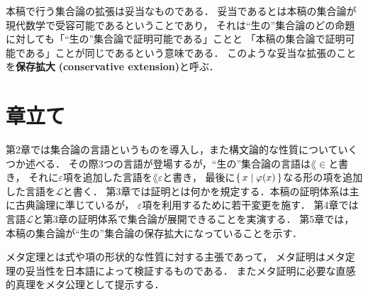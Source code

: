 	本稿で行う集合論の拡張は妥当なものである．
	妥当であるとは本稿の集合論が現代数学で受容可能であるということであり，
	それは``生の''集合論のどの命題に対しても「``生の''集合論で証明可能である」ことと
	「本稿の集合論で証明可能である」ことが同じであるという意味である．
	このような妥当な拡張のことを{\bf 保存拡大}
	{\bf (conservative extension)}と呼ぶ．
	
\section{章立て}
	第2章では集合論の言語というものを導入し，また構文論的な性質についていくつか述べる．
	その際3つの言語が登場するが，``生の''集合論の言語は$\lang{\in}$と書き，
	それに$\varepsilon$項を追加した言語を$\lang{\varepsilon}$と書き，
	最後に$\{\, x \mid \varphi(x)\, \}$なる形の項を追加した言語を$\mathcal{L}$と書く．
	第3章では証明とは何かを規定する．本稿の証明体系は主に古典論理に準じているが，
	$\varepsilon$項を利用するために若干変更を施す．
	第4章では言語$\mathcal{L}$と第3章の証明体系で集合論が展開できることを実演する．
	第5章では，本稿の集合論が``生の''集合論の保存拡大になっていることを示す．
	
	メタ定理とは式や項の形状的な性質に対する主張であって，
	メタ証明はメタ定理の妥当性を日本語によって検証するものである．
	またメタ証明に必要な直感的真理をメタ公理として提示する．
	
